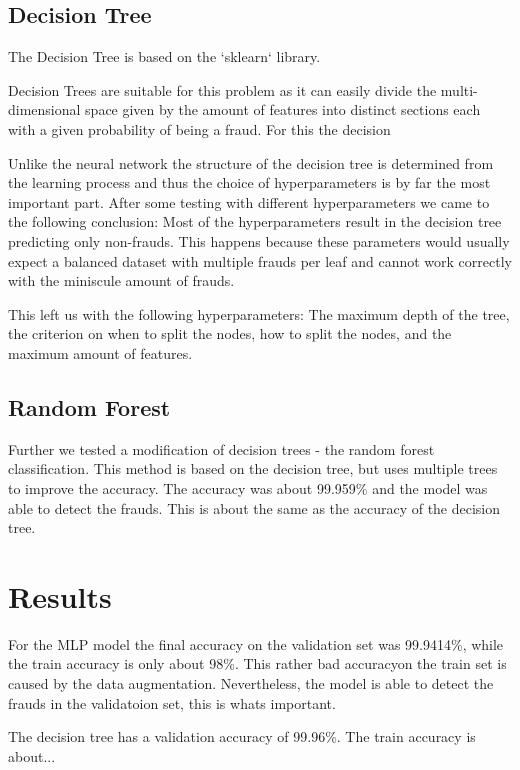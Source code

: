 \documentclass[a4paper, 10pt, conference]{ieeeconf}      %
\begin{document}
\subsection{Decision Tree}

The Decision Tree is based on the `sklearn` library. 

Decision Trees are suitable for this problem as it can easily divide the multi-dimensional space given by the amount of features into distinct sections each with a given probability of being a fraud. For this the decision 

Unlike the neural network the structure of the decision tree is determined from the learning process and thus the choice of hyperparameters is by far the most important part.
After some testing with different hyperparameters we came to the following conclusion: Most of the hyperparameters result in the decision tree predicting only non-frauds. 
This happens because these parameters would usually expect a balanced dataset with multiple frauds per leaf and cannot work correctly with the miniscule amount of frauds.

This left us with the following hyperparameters: The maximum depth of the tree, the criterion on when to split the nodes, how to split the nodes, and the maximum amount of features. 



\subsection{Random Forest}

Further we tested a modification of decision trees - the random forest classification. This method is based on the decision tree, but uses multiple trees to improve the accuracy. 
The accuracy was about 99.959\% and the model was able to detect the frauds. This is about the same as the accuracy of the decision tree. 


\section{Results}
\label{sec:results}
For the MLP model the final accuracy on the validation set was 99.9414\%, while the train accuracy is only about 98\%. 
This rather bad accuracyon the train set is caused by the data augmentation. Nevertheless, the model is able to detect the frauds in the validatoion set, this is whats important. 



The decision tree has a validation accuracy of 99.96\%. The train accuracy is about... %
\end{document}

